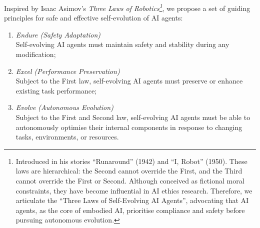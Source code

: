 \documentclass[]{selfevolagent}
\theoremstyle{plain}
\theoremstyle{definition}
\theoremstyle{remark}
\begin{document}
Inspired by Isaac Asimov’s \textit{Three Laws of Robotics\footnote{Introduced in his stories ``Runaround'' (1942) and ``I, Robot'' (1950). These laws are hierarchical: the Second cannot override the First, and the Third cannot override the First or Second. Although conceived as fictional moral constraints, they have become influential in AI ethics research. Therefore, we articulate the ``Three Laws of Self-Evolving AI Agents'', advocating that AI agents, as the core of embodied AI, prioritise compliance and safety before pursuing autonomous evolution.}}, we propose a set of guiding principles for safe and effective self-evolution of AI agents: 

\vspace{0.6em}
\begin{tcolorbox}[
  colback=selfevolagent_light!20,
  colframe=selfevolagent_light!80,
  colbacktitle=selfevolagent_light!80,
  coltitle=black,
  title={\bfseries\fontfamily{ppl}\selectfont{Three Laws of Self-Evolving AI Agents}},
  boxrule=2pt,
  arc=5pt,
  drop shadow,
  parbox=false,
  before skip=5pt,
  after skip=5pt,
  left=5pt,   
  right=5pt,
]
\begin{enumerate}[label=\Roman*.]
\item \textit{Endure (Safety Adaptation)} \\ Self-evolving AI agents must maintain safety and stability during any modification;
\item \textit{Excel (Performance Preservation)} \\ Subject to the First law, self-evolving AI agents must preserve or enhance existing task performance;
\item \textit{Evolve (Autonomous Evolution)} \\ Subject to the First and Second law, self-evolving AI agents must be able to autonomously optimise their internal components in response to changing tasks, environments, or resources.
\end{enumerate}

\end{tcolorbox}
\end{document}
